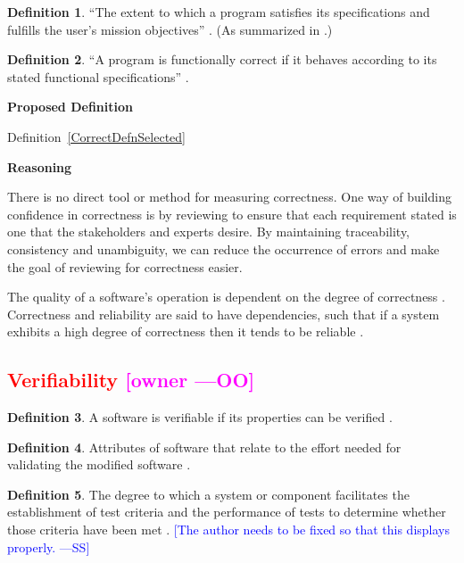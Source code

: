 \documentclass[letterpaper,cleveref]{lipics-v2019}
\newcommand{\authornote}[3]{\textcolor{#1}{[#3 ---#2]}}
\newcommand{\authornote}[3]{}
\newcommand{\wss}[1]{\authornote{blue}{SS}{#1}} %
\newcommand{\oo}[1]{\authornote{magenta}{OO}{#1}} %
\newcommand{\notdone}[1]{\textcolor{red}{#1}}
\theoremstyle{definition}
\newtheorem{defn}{Definition}
\begin{document}
\begin{defn}
	``The extent to which a program satisfies its specifications and fulfills the
	user's mission objectives'' \citep{McCallEtAl1977}. (As summarized in
	\citet{VanVliet2000}.)
\end{defn}

\begin{defn}
	``A program is functionally correct if it behaves according to its stated
	functional specifications'' \citep{ghezzi1991fundamentals}.
\end{defn}

\noindent \textbf{Proposed Definition}

Definition~\ref{CorrectDefnSelected}

\noindent \textbf{Reasoning}

There is no direct tool or method for measuring correctness. One way of building
confidence in correctness is by reviewing to ensure that each requirement stated
is one that the stakeholders and experts desire.  By maintaining traceability,
consistency and unambiguity, we can reduce the occurrence of errors and make the
goal of reviewing for correctness easier.

The quality of a software's operation is dependent on the degree of correctness
\citep{berander2005software}. Correctness and reliability are said to have
dependencies, such that if a system exhibits a high degree of correctness then
it tends to be reliable \citep{GhezziEtAl2003}.

\subsection{\notdone{Verifiability} \oo{owner}}

\begin{defn}
	A software is verifiable if its properties can be verified
	\citep{GhezziEtAl2003}.
\end{defn}

\begin{defn}
	Attributes of software that relate to the effort needed for validating the
	modified software \citep{berander2005software}.
\end{defn}

\begin{defn}
	The degree to which a system or component facilitates the establishment of
	test criteria and the performance of tests to determine whether those criteria
	have been met \citep{IEEEStdGlossarySET1990}. \wss{The author needs to be
		fixed so that this displays properly.}
\end{defn}
\end{document}
